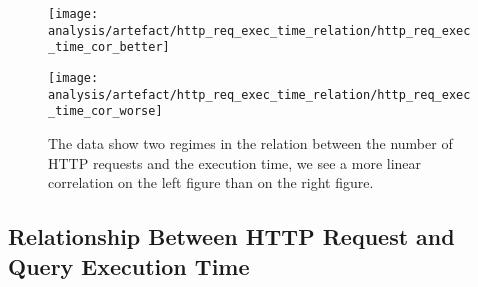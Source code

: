 \begin{figure}[htbp]
    \centering
    \begin{minipage}[t]{0.45\linewidth}
        \centering
        \texttt{[image: analysis/artefact/http\_req\_exec\_time\_relation/http\_req\_exec\_time\_cor\_better]}
        \label{fig:http_req_exec_time_cor_better}
    \end{minipage}
    \hspace{0.05\textwidth}
    \begin{minipage}[t]{0.45\linewidth}
        \centering
        \texttt{[image: analysis/artefact/http\_req\_exec\_time\_relation/http\_req\_exec\_time\_cor\_worse]}
        \label{fig:http_req_exec_time_cor_worse}
    \end{minipage}

    \caption{
        The data show two regimes in the relation between the number of HTTP requests and the execution time, 
        we see a more linear correlation on the left figure than on the right figure.
        }
    \label{fig:http_req_exec_time_cor}
\end{figure}

\subsection{Relationship Between HTTP Request and Query Execution Time}


